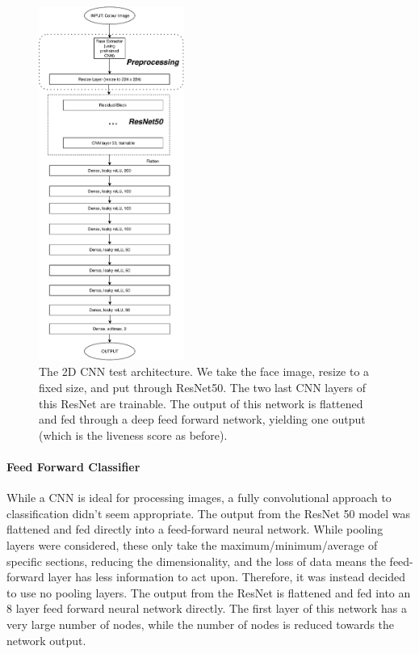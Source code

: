 \documentclass[12pt,a4paper]{article}
\begin{document}
                \begin{figure}
                    \centering
                    \includegraphics[width=180px]{2DCNNArchitecture.pdf}
                    \caption{The 2D CNN test architecture. We take the face image, resize to a fixed size, and put through ResNet50. The two last CNN layers
                    of this ResNet are trainable. The output of this network is flattened and fed through a deep feed forward network, yielding one output (which is the
                    liveness score as before).}
                    \label{2DCNNArchitecture}
                \end{figure}
                \paragraph{Feed Forward Classifier}
                While a CNN is ideal for processing images, a fully convolutional approach to classification didn't seem appropriate. The output from the ResNet 50 model was flattened and fed directly into a feed-forward neural network.
                While pooling layers were considered, these only take the maximum/minimum/average of specific sections, reducing the dimensionality, and the loss of data means the feed-forward layer has less information to act upon. Therefore,
                it was instead decided to use no pooling layers. The output from the ResNet is flattened and fed into an 8 layer feed forward neural network directly. The first layer of this network has a very large number of nodes,
                while the number of nodes is reduced towards the network output.
                
\end{document}
